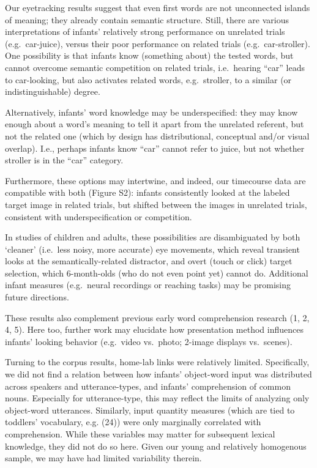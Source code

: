 \documentclass[9pt,twocolumn,twoside,]{pnas-new}
\begin{document}
Our eyetracking results suggest that even first words are not
unconnected islands of meaning; they already contain semantic structure.
Still, there are various interpretations of infants' relatively strong
performance on unrelated trials (e.g.~car-juice), versus their poor
performance on related trials (e.g.~car-stroller). One possibility is
that infants know (something about) the tested words, but cannot
overcome semantic competition on related trials, i.e.~hearing ``car''
leads to car-looking, but also activates related words, e.g.~stroller,
to a similar (or indistinguishable) degree.

Alternatively, infants' word knowledge may be underspecified: they may
know enough about a word's meaning to tell it apart from the unrelated
referent, but not the related one (which by design has distributional,
conceptual and/or visual overlap). I.e., perhaps infants know ``car''
cannot refer to juice, but not whether stroller is in the ``car''
category.

Furthermore, these options may intertwine, and indeed, our timecourse
data are compatible with both (Figure S2): infants consistently looked
at the labeled target image in related trials, but shifted between the
images in unrelated trials, consistent with underspecification or
competition.

In studies of children and adults, these possibilities are disambiguated
by both `cleaner' (i.e.~less noisy, more accurate) eye movements, which
reveal transient looks at the semantically-related distractor, and overt
(touch or click) target selection, which 6-month-olds (who do not even
point yet) cannot do. Additional infant measures (e.g.~neural recordings
or reaching tasks) may be promising future directions.

These results also complement previous early word comprehension research
(1, 2, 4, 5). Here too, further work may elucidate how presentation
method influences infants' looking behavior (e.g.~video vs.~photo;
2-image displays vs.~scenes).

Turning to the corpus results, home-lab links were relatively limited.
Specifically, we did not find a relation between how infants'
object-word input was distributed across speakers and utterance-types,
and infants' comprehension of common nouns. Especially for
utterance-type, this may reflect the limits of analyzing only
object-word utterances. Similarly, input quantity measures (which are
tied to toddlers' vocabulary, e.g. (24)) were only marginally correlated
with comprehension. While these variables may matter for subsequent
lexical knowledge, they did not do so here. Given our young and
relatively homogenous sample, we may have had limited variability
therein.
\end{document}

